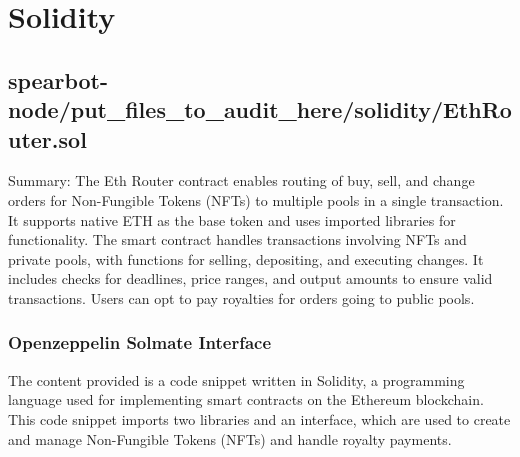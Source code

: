 \hypertarget{solidity}{%
\section{Solidity}\label{solidity}}

\hypertarget{spearbot-nodeput_files_to_audit_heresolidityethroutersol}{%
\subsection{spearbot-node/put\_files\_to\_audit\_here/solidity/EthRouter.sol}\label{spearbot-nodeput_files_to_audit_heresolidityethroutersol}}

Summary: The Eth Router contract enables routing of buy, sell, and
change orders for Non-Fungible Tokens (NFTs) to multiple pools in a
single transaction. It supports native ETH as the base token and uses
imported libraries for functionality. The smart contract handles
transactions involving NFTs and private pools, with functions for
selling, depositing, and executing changes. It includes checks for
deadlines, price ranges, and output amounts to ensure valid
transactions. Users can opt to pay royalties for orders going to public
pools.

\hypertarget{openzeppelin-solmate-interface}{%
\subsubsection{Openzeppelin Solmate
Interface}\label{openzeppelin-solmate-interface}}

The content provided is a code snippet written in Solidity, a
programming language used for implementing smart contracts on the
Ethereum blockchain. This code snippet imports two libraries and an
interface, which are used to create and manage Non-Fungible Tokens
(NFTs) and handle royalty payments.

